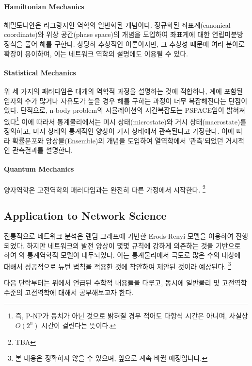 \documentclass[titlepage]{article}
\begin{document}
\paragraph{Hamiltonian Mechanics} 

해밀토니안은 라그랑지안 역학의 일반화된 개념이다. 정규화된 좌표계(canonical coordinate)와 위상 공간(phase space)의 개념을 도입하여 좌표게에 대한 연립미분방정식을 풀어 해를 구한다. 상당히 추상적인 이론이지만, 그 추상성 때문에 여러 분야로 확장이 용이하며, 이는 네트워크 역학의 설명에도 이용될 수 있다\cite{hamiltonian1}. 


\paragraph{Statistical Mechanics} 

위 세 가지의 패러다임은 대개의 역학적 과정을 설명하는 것에 적합하나, 계에 포함된 입자의 수가 많거나 자유도가 높을 경우 해를 구하는 과정이 너무 복잡해진다는 단점이 있다. 단적으로, n-body problem의 시뮬레이션의 시간복잡도는 PSPACE\cite{nbody}임이 밝혀져 있다\footnote{즉, P-NP가 동치가 아닌 것으로 밝혀질 경우 적어도 다항식 시간은 아니며, 사실상 $O(2^n)$ 시간이 걸린다는 뜻이다.} 이에 따라서 통계물리에서는 미시 상태(microstate)와 거시 상태(macrostate)를 정의하고, 미시 상태의 통계적인 양상이 거시 상태에서 관측된다고 가정한다. 이에 따라 확률분포와 앙상블(Ensemble)의 개념을 도입하여 열역학에서 '관측'되었던 거시적인 관측결과를 설명한다. 

\paragraph{Quantum Mechanics} 

양자역학은 고전역학의 패러다임과는 완전히 다른 가정에서 시작한다. \footnote{TBA}


\subsection{Application to Network Science} 

전통적으로 네트워크 분석은 랜덤 그래프에 기반한 Erods-Renyi 모델\cite{erdos}을 이용하여 진행되었다. 하지만 네트워크의 발전 양상이 몇몇 규칙에 강하게 의존하는 것을 기반으로 하여 \cite{barbasi}의 통계역학적 모델이 대두되었다. 이는 통계물리에서 극도로 많은 수의 대상에 대해서 성공적으로 뉴턴 법칙을 적용한 것에 착안하여 제안된 것이라 예상된다. \footnote{본 내용은 정확하지 않을 수 있으며, 앞으로 계속 바뀔 예정입니다.}

다음 단락부터는 위에서 언급된 수학적 내용들을 다루고, 동시에 일반물리 및 고전역학 수준의 고전역학에 대해서 공부해보고자 한다. 

\newpage
 
\newpage
 
\newpage
 
\newpage
 

\newpage

 
\end{document}
